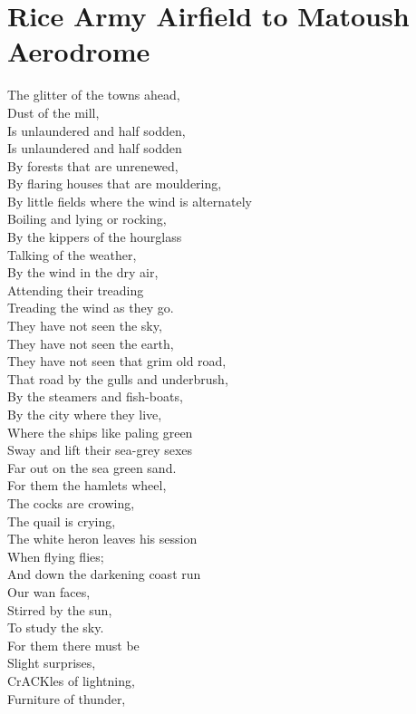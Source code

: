\documentclass[smalldemyvopaper,11pt,twoside,onecolumn,openright,extrafontsizes]{memoir}
\begin{document}
\chapter{Rice Army Airfield to Matoush Aerodrome}
The glitter of the towns ahead,
\\Dust of the mill,
\\Is unlaundered and half sodden,
\\Is unlaundered and half sodden
\\By forests that are unrenewed,
\\By flaring houses that are mouldering,
\\By little fields where the wind is alternately
\\Boiling and lying or rocking,
\\By the kippers of the hourglass
\\Talking of the weather,
\\By the wind in the dry air,
\\Attending their treading
\\Treading the wind as they go.
\\They have not seen the sky,
\\They have not seen the earth,
\\They have not seen that grim old road,
\\That road by the gulls and underbrush,
\\By the steamers and fish-boats,
\\By the city where they live,
\\Where the ships like paling green
\\Sway and lift their sea-grey sexes
\\Far out on the sea green sand.
\\For them the hamlets wheel,
\\The cocks are crowing,
\\The quail is crying,
\\The white heron leaves his session
\\When flying flies;
\\And down the darkening coast run
\\Our wan faces,
\\Stirred by the sun,
\\To study the sky.
\\For them there must be
\\Slight surprises,
\\CrACKles of lightning,
\\Furniture of thunder,
\end{document}
